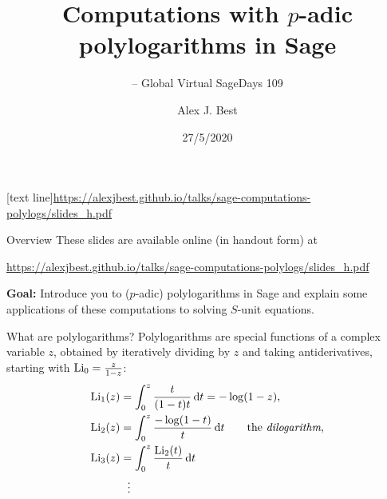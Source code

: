 \author{Alex J. Best}
\date{27/5/2020}
\title{Computations with $p$-adic polylogarithms in Sage}
\subtitle{-- Global Virtual SageDays 109}
[text line]{\url{https://alexjbest.github.io/talks/sage-computations-polylogs/slides_h.pdf}}



\begin{frame}
    \titlepage


\end{frame}


\begin{frame}{Overview}
    These slides are available online (in handout form) at

    {\url{https://alexjbest.github.io/talks/sage-computations-polylogs/slides_h.pdf}}

    \pause

    \textbf{Goal:}  Introduce you to ($p$-adic) polylogarithms in Sage and explain some applications of these computations to solving $S$-unit equations.

\end{frame}

\begin{frame}{What are polylogarithms?}
    Polylogarithms are special functions of a complex variable $z$, obtained by iteratively dividing by $z$ and taking antiderivatives, starting with $\operatorname{Li}_0 = \frac{z}{1-z}$:
    \begin{align*}
        \operatorname{Li}_1 (z) &= \int_0^z \frac{t}{(1-t)t} \mathop{}\!\mathrm{d} t= - \log(1-z)\text,\\
        \operatorname{Li}_2 (z) &= \int_0^z \frac{-\log(1-t)}t \mathop{}\!\mathrm{d} t \qquad \text{the \emph{dilogarithm},}\\
        \operatorname{Li}_3 (z) &= \int_0^z \frac{\operatorname{Li}_2(t)}t \mathop{}\!\mathrm{d} t\\
        &\ \ \vdots
    \end{align*}
\end{frame}


